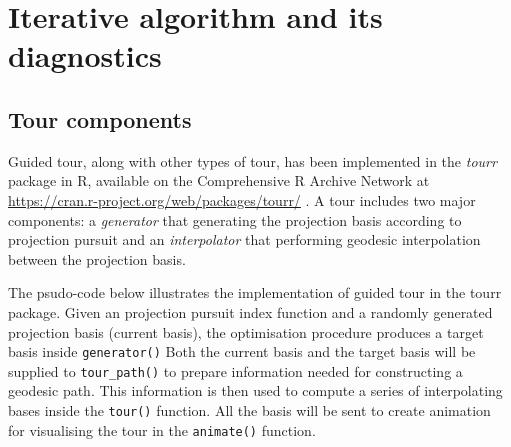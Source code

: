 \documentclass[12pt]{article}
\begin{document}
\hypertarget{iterative-algorithm-and-its-diagnostics}{%
\section{Iterative algorithm and its
diagnostics}\label{iterative-algorithm-and-its-diagnostics}}

\hypertarget{tour-components}{%
\subsection{Tour components}\label{tour-components}}

Guided tour, along with other types of tour, has been implemented in the
\emph{tourr} package in R, available on the Comprehensive R Archive
Network at \url{https://cran.r-project.org/web/packages/tourr/}
\citep{wickham2011tourrpackage}. A tour includes two major components: a
\emph{generator} that generating the projection basis according to
projection pursuit and an \emph{interpolator} that performing geodesic
interpolation between the projection basis.

The psudo-code below illustrates the implementation of guided tour in
the tourr package. Given an projection pursuit index function and a
randomly generated projection basis (current basis), the optimisation
procedure produces a target basis inside \texttt{generator()} Both the
current basis and the target basis will be supplied to
\texttt{tour\_path()} to prepare information needed for constructing a
geodesic path. This information is then used to compute a series of
interpolating bases inside the \texttt{tour()} function. All the basis
will be sent to create animation for visualising the tour in the
\texttt{animate()} function.
\end{document}
